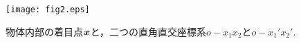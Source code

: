 \documentclass[10pt,a4j]{jarticle}
\begin{document}
\begin{figure}[h]
	\begin{center}
	\texttt{[image: fig2.eps]} 
	\end{center}
	\caption{物体内部の着目点$\mbox{\boldmath $x$}$と，二つの直角直交座標系$o-x_1x_2$と$o-x_1'x_2'$.} 
	\label{fig:fig2}
\end{figure}
\end{document}
